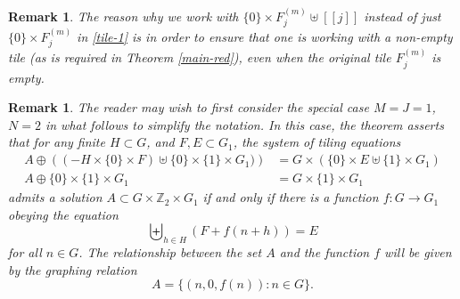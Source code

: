 \documentclass[reqno,a4paper,12pt]{amsart}
\numberwithin{equation}{section}
\numberwithin{figure}{section}
\def\Z{\mathbb{Z}}
\theoremstyle{plain}
\newtheorem{remark}[thm]{Remark}
\theoremstyle{definition}
\begin{document}
\begin{remark} The reason why we work with $\{0\} \times F_j^{(m)} \uplus [[j]]$ instead of just $\{0\} \times F_j^{(m)}$ in \eqref{tile-1} is in order to ensure that one is working with a non-empty tile (as is required in Theorem \ref{main-red}), even when the original tile $F_j^{(m)}$ is empty.
\end{remark}

\begin{remark}
The reader may wish to first consider the special case $M=J=1$, $N=2$ in what follows to simplify the notation.  In this case, the theorem asserts that for any finite $H \subset G$, and $F, E \subset G_1$, the system of tiling equations
\begin{align*}
    A \oplus \left(  (-H \times \{0\} \times F) \uplus \{0\} \times \{1\} \times G_1)\right) &= G \times (\{0\} \times E \uplus \{1\} \times G_1) \\
A \oplus \{0\} \times \{1\} \times G_1 &= G \times \{1\} \times G_1
\end{align*} 
admits a solution $A \subset G \times \Z_2 \times G_1$ if and only if there is a function $f \colon G \to G_1$ obeying the equation
$$ \biguplus_{h \in H} (F + f(n+h)) = E$$
for all $n \in G$.  The relationship between the set $A$ and the function $f$ will be given by the graphing relation
$$ A = \{ (n,0,f(n)): n \in G\}.$$
\end{remark}
\end{document}
